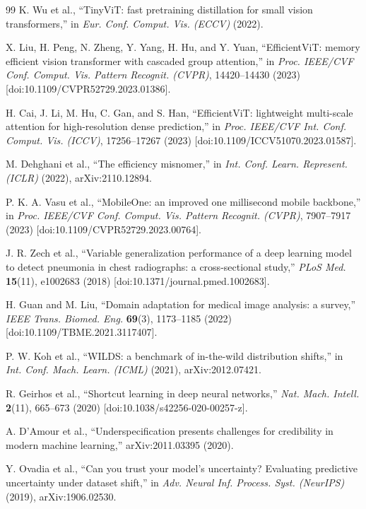 \documentclass[12pt,letterpaper]{article}
\begin{document}
{\begin{thebibliography}{99}
K. Wu et al., ``TinyViT: fast pretraining distillation for small vision transformers,'' in \textit{Eur. Conf. Comput. Vis. (ECCV)} (2022).

X. Liu, H. Peng, N. Zheng, Y. Yang, H. Hu, and Y. Yuan, ``EfficientViT: memory efficient vision transformer with cascaded group attention,'' in \textit{Proc. IEEE/CVF Conf. Comput. Vis. Pattern Recognit. (CVPR)}, 14420--14430 (2023) [doi:10.1109/CVPR52729.2023.01386].

H. Cai, J. Li, M. Hu, C. Gan, and S. Han, ``EfficientViT: lightweight multi-scale attention for high-resolution dense prediction,'' in \textit{Proc. IEEE/CVF Int. Conf. Comput. Vis. (ICCV)}, 17256--17267 (2023) [doi:10.1109/ICCV51070.2023.01587].

M. Dehghani et al., ``The efficiency misnomer,'' in \textit{Int. Conf. Learn. Represent. (ICLR)} (2022), arXiv:2110.12894.

P. K. A. Vasu et al., ``MobileOne: an improved one millisecond mobile backbone,'' in \textit{Proc. IEEE/CVF Conf. Comput. Vis. Pattern Recognit. (CVPR)}, 7907--7917 (2023) [doi:10.1109/CVPR52729.2023.00764].

J. R. Zech et al., ``Variable generalization performance of a deep learning model to detect pneumonia in chest radiographs: a cross-sectional study,'' \textit{PLoS Med.} \textbf{15}(11), e1002683 (2018) [doi:10.1371/journal.pmed.1002683].

H. Guan and M. Liu, ``Domain adaptation for medical image analysis: a survey,'' \textit{IEEE Trans. Biomed. Eng.} \textbf{69}(3), 1173--1185 (2022) [doi:10.1109/TBME.2021.3117407].

P. W. Koh et al., ``WILDS: a benchmark of in-the-wild distribution shifts,'' in \textit{Int. Conf. Mach. Learn. (ICML)} (2021), arXiv:2012.07421.

R. Geirhos et al., ``Shortcut learning in deep neural networks,'' \textit{Nat. Mach. Intell.} \textbf{2}(11), 665--673 (2020) [doi:10.1038/s42256-020-00257-z].

A. D'Amour et al., ``Underspecification presents challenges for credibility in modern machine learning,'' arXiv:2011.03395 (2020).

Y. Ovadia et al., ``Can you trust your model's uncertainty? Evaluating predictive uncertainty under dataset shift,'' in \textit{Adv. Neural Inf. Process. Syst. (NeurIPS)} (2019), arXiv:1906.02530.


\end{thebibliography}}
\end{document}
